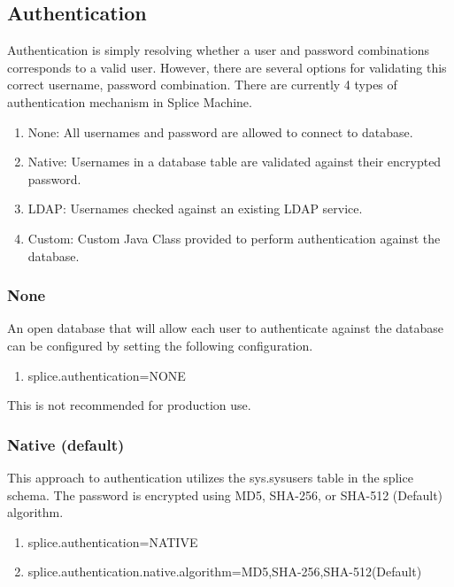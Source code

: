 \documentclass{article}
\begin{document}
\subsection{Authentication}

Authentication is simply resolving whether a user and password combinations
corresponds to a valid user.  However, there are several options for validating
this correct username, password combination.  There are currently 4 types of
authentication mechanism in Splice Machine.
\begin{enumerate}
        \item None: All usernames and password are allowed to connect to database.
        \item Native: Usernames in a database table are validated against their
        encrypted password.
        \item LDAP: Usernames checked against an existing LDAP service.
        \item Custom: Custom Java Class provided to perform authentication against the
        database.
\end{enumerate}

\subsubsection{None}
An open database that will allow each user to authenticate against the database
can be configured by setting the following configuration.

\begin{enumerate}
        \item splice.authentication=NONE
\end{enumerate}

This is not recommended for production use.


\subsubsection{Native (default)}
This approach to authentication utilizes the sys.sysusers table in the splice
schema.  The password is encrypted using MD5, SHA-256, or
SHA-512 (Default) algorithm.   

\begin{enumerate}
        \item splice.authentication=NATIVE
      \item splice.authentication.native.algorithm=MD5,SHA-256,SHA-512(Default)
\end{enumerate}
\end{document}
